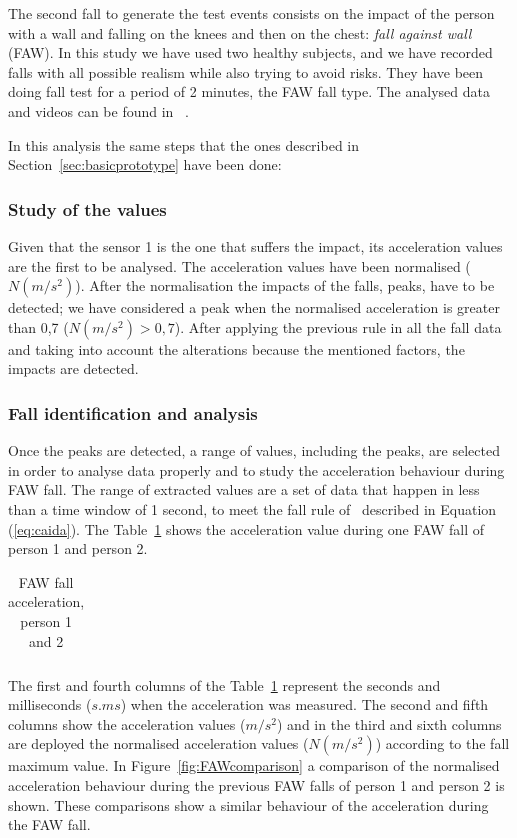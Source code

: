 \documentclass[conference]{IEEEtran}
\theoremstyle{definition}
\begin{document}
The second fall to generate the test events consists on the impact of the person with 
a wall and falling on the knees and then on the chest: \textit{fall against wall} (FAW). 
In this study we have used two healthy subjects, and we have recorded falls with all 
possible realism while also trying to avoid risks. They have been doing fall test for a period 
of 2 minutes, the FAW fall type. The analysed data and videos can be found in ~\cite{}.

In this analysis the same steps that the ones described in Section~\ref{sec:basicprototype} 
have been done:

\subsubsection*{Study of the values} Given that the sensor 1 is the one that suffers the 
impact, its acceleration values are the first to be analysed. The acceleration values have 
been normalised ($N(m/s^2)$). After the normalisation the impacts of the falls, peaks, 
have to be detected; we have considered a peak when the normalised acceleration is 
greater than 0,7 ($N(m/s^2) > 0,7$). After applying the previous rule in all the fall data 
and taking into account the alterations because the mentioned factors, the impacts are detected.

\subsubsection*{Fall identification and analysis} Once the peaks are detected, a range of values, 
including the peaks, are selected in order to analyse data properly and to study the acceleration 
behaviour during FAW fall. The range of extracted values are a set of data that happen in less 
than a time window of 1 second, to meet the fall rule of~\cite{Luder2009} described in 
Equation (\ref{eq:caida}). The Table~\ref{tabla:FAW} shows the acceleration value during one FAW 
fall of person 1 and person 2. 

\begin{table}[!h]
 \centering
 \begin{tabular}{*{5}{r}}
   
 \end{tabular}
 \caption{FAW fall acceleration, person 1 and 2}%
 \label{tabla:FAW}
\end{table}

The first and fourth columns of the Table~\ref{tabla:FAW} represent the seconds and milliseconds 
($s.ms$) when the acceleration was measured. The second and fifth columns show the acceleration 
values ($m/s^2$) and in the third and sixth columns are deployed the normalised acceleration values 
($N(m/s^2)$) according to the fall maximum value. In Figure~\ref{fig:FAWcomparison} a comparison 
of the normalised acceleration behaviour during the previous FAW falls of person 1 and person 2 is 
shown. These comparisons show a similar behaviour of the acceleration during the FAW fall.
\end{document}
